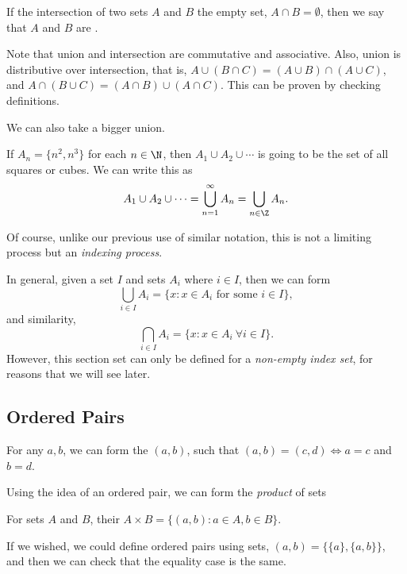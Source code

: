 \documentclass[a4paper]{scrreprt}
\begin{document}
\begin{definition}[Disjoint]
	If the intersection of two sets $A$ and $B$ the empty set, $A \cap B = \emptyset$, then we say that $A$ and $B$ are .
\end{definition}

Note that union and intersection are commutative and associative. Also, union is distributive over intersection, that is, $A \cup (B \cap C) = (A \cup B) \cap (A \cup C)$, and $A \cap (B \cup C) = (A \cap B) \cup (A \cap C)$. This can be proven by checking definitions.

We can also take a bigger union.
\begin{example}
	If $A_n = \{n^2, n^3 \}$ for each $n \in \N$, then
	$
	A_1 \cup A_2 \cup \cdots
	$
	is going to be the set of all squares or cubes. We can write this as
	$$
	A_1 \cup A_2 \cup \cdots = \bigcup_{n = 1}^{\infty} A_n = \bigcup_{n \in \Z} A_n.
	$$
\end{example}
Of course, unlike our previous use of similar notation, this is not a limiting process but an \emph{indexing process}. 

In general, given a set $I$ and sets $A_i$ where $i \in I$, then we can form
$$
\bigcup_{i \in I} A_i = \{x : x \in A_i \text{ for some } i \in I\},
$$
and similarity,
$$
\bigcap_{i \in I} A_i = \{x : x \in A_i\ \forall i \in I\}.
$$
However, this section set can only be defined for a \emph{non-empty index set}, for reasons that we will see later.


\subsection{Ordered Pairs}
\vspace{\baselineskip}
\begin{definition}
	For any $a, b$, we can form the  $(a, b)$, such that $(a, b) = (c, d) \iff a = c$ and $b = d$.
\end{definition}

Using the idea of an ordered pair, we can form the \emph{product} of sets
\begin{definition}
	For sets $A$ and $B$, their  $A \times B = \{(a ,b) : a \in A, b \in B\}$.
\end{definition}

\begin{remark}
	If we wished, we could define ordered pairs using sets, $(a, b) = \{\{a\}, \{a, b\}\}$, and then we can check that the equality case is the same.
\end{remark}
\end{document}
